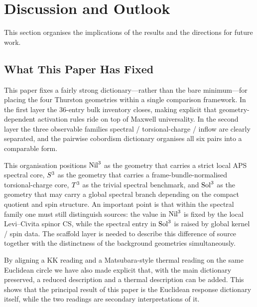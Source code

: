 \section{Discussion and Outlook}
\label{sec:discussion}

This section organises the implications of the results and the directions
for future work.

\subsection{What This Paper Has Fixed}
\label{sec:discussion:fixed}

This paper fixes a fairly strong dictionary---rather than the bare
minimum---for placing the four Thurston geometries within a single
comparison framework.  In the first layer the 36-entry bulk inventory closes,
making explicit that geometry-dependent activation rules ride on top of
Maxwell universality.  In the second layer the three observable families
spectral / torsional-charge / inflow are clearly separated, and the pairwise
cobordism dictionary organises all six pairs into a comparable form.

This organisation positions $\mathrm{Nil}^3$ as the geometry that carries a
strict local APS spectral core, $S^3$ as the geometry that carries a
frame-bundle-normalised torsional-charge core, $T^3$ as the trivial
spectral benchmark, and $\mathrm{Sol}^3$ as the geometry that may carry a global
spectral branch depending on the compact quotient and spin structure.  An
important point is that within the spectral family one must still
distinguish sources: the value in $\mathrm{Nil}^3$ is fixed by the local
Levi--Civita spinor CS, while the spectral entry in $\mathrm{Sol}^3$ is raised
by global kernel / spin data.  The scaffold layer is needed to describe
this difference of source together with the distinctness of the background
geometries simultaneously.

By aligning a KK reading and a Matsubara-style thermal reading on the same
Euclidean circle we have also made explicit that, with the main dictionary
preserved, a reduced description and a thermal description can be added.
This shows that the principal result of this paper is the Euclidean
response dictionary itself, while the two readings are secondary
interpretations of it.

